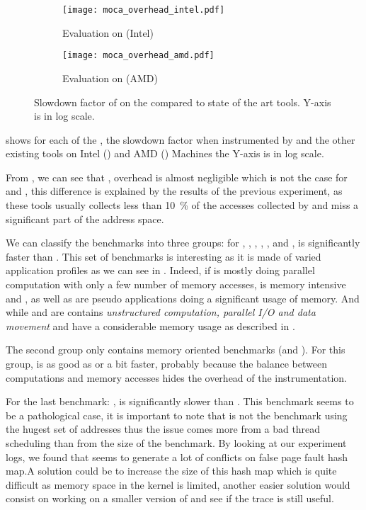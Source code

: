 \begin{figure}[htb]
    \centering
    \begin{subfigure}{\linewidth}
        \texttt{[image: moca\_overhead\_intel.pdf]}
        \caption{Evaluation on \Edel (Intel)}
        \label{fig:ovh-Intel}
    \end{subfigure}
    \begin{subfigure}{\linewidth}
        \texttt{[image: moca\_overhead\_amd.pdf]}
        \caption{Evaluation on \Stremi (AMD)}
        \label{fig:ovh-AMD}
    \end{subfigure}
    \caption{Slowdown factor of \Moca on the \NPB compared to state of the art tools.
    Y-axis is in log scale.}
    \label{fig:ovh}
\end{figure}

 shows for each of the \NPB, the slowdown factor when
instrumented by \Moca and the other existing tools on Intel
() and AMD () Machines the Y-axis is in
log scale.

From , we can see that \Mitos, \MitosTun overhead is
almost negligible which is not the case for \Moca and \TABARNAC, this
difference is explained by the results of the previous experiment, as these
tools usually collects less than \SI{10}{\%} of the accesses collected by \Moca and
miss a significant part of the address space.


We can classify the benchmarks into three groups:
for \BT, \CG, \DC,  \EP, \LU, \SP and \UA, \Moca is
significantly faster than \TABARNAC. This set of benchmarks is interesting as
it is made of varied application profiles as we can see in .
Indeed, if \EP is mostly doing parallel computation with only a few number of
memory accesses, \CG is memory intensive and
\BT, \LU as well as \SP are pseudo applications doing a significant usage of memory.
And while \UA and \DC are contains \emph{unstructured computation,
parallel I/O and data movement} and have a considerable memory usage as
described in .

The second group only contains memory oriented benchmarks (\FT and
\IS). For this group, \Moca is as good as \TABARNAC or a bit faster, probably
because the balance between computations and memory accesses hides the
overhead of the instrumentation.

For the last benchmark: \MG, \Moca is significantly slower than \TABARNAC. This benchmark
seems to be a pathological case, it is important to note that \MG is not the
benchmark using the hugest set of addresses thus the issue comes more from a
bad thread scheduling than from the size of the benchmark. By looking at our
experiment logs, we found that \MG seems to generate a lot of conflicts on
\Moca false page fault hash map.A solution could be to increase the size of
this hash map which is quite difficult as memory space in the kernel is
limited, another easier solution would consist on working on a smaller version
of \MG and see if the trace is still useful.

